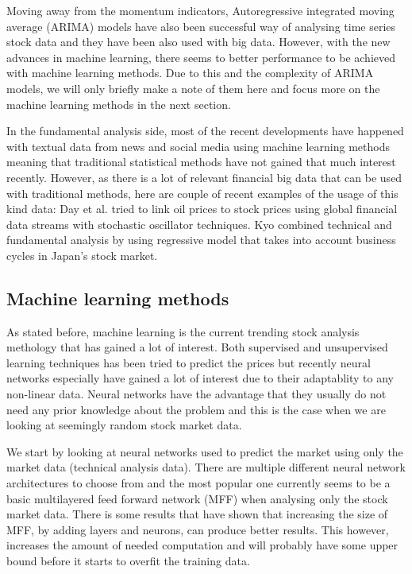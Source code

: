 Moving away from the momentum indicators, Autoregressive integrated moving average (ARIMA) models have also been successful way of analysing time series stock data and they have been also used with big data. \cite{wang}
However, with the new advances in machine learning, there seems to better performance to be achieved with machine learning methods. \cite{khashei}
Due to this and the complexity of ARIMA models, we will only briefly make a note of them here and focus more on the machine learning methods in the next section.

In the fundamental analysis side, most of the recent developments have happened with textual data from news and social media using machine learning methods meaning that traditional statistical methods have not gained that much interest recently.
However, as there is a lot of relevant financial big data that can be used with traditional methods, here are couple of recent examples of the usage of this kind data:
Day et al. \cite{day} tried to link oil prices to stock prices using global financial data streams with stochastic oscillator techniques.
Kyo \cite{kyo} combined technical and fundamental analysis by using regressive model that takes into account business cycles in Japan's stock market.

\subsection{Machine learning methods}

As stated before, machine learning is the current trending stock analysis methology that has gained a lot of interest.
Both supervised and unsupervised learning techniques has been tried to predict the prices but recently neural networks especially have gained a lot of interest due to their adaptablity to any non-linear data.
Neural networks have the advantage that they usually do not need any prior knowledge about the problem and this is the case when we are looking at seemingly random stock market data.

We start by looking at neural networks used to predict the market using only the market data (technical analysis data).
There are multiple different neural network architectures to choose from and the most popular one currently seems to be a basic multilayered feed forward network (MFF) when analysing only the stock market data.
There is some results that have shown that increasing the size of MFF, by adding layers and neurons, can produce better results.
This however, increases the amount of needed computation and will probably have some upper bound before it starts to overfit the training data. \cite{senguptaa}

